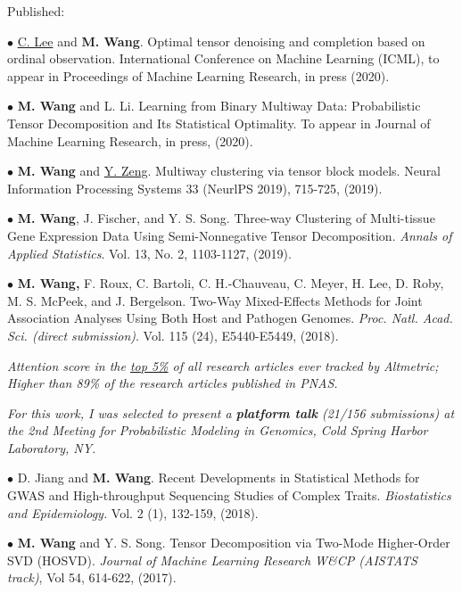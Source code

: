 \documentclass[letterpaper]{article}
\renewenvironment{itemize}{
  \begin{list}{}{
    \setlength{\leftmargin}{1.5em}
  }
}{
  \end{list}
}
\begin{document}
Published:
\begin{itemize}
\item$\bullet$ \underline{C. Lee} and {\bf M. Wang}. Optimal tensor denoising and completion based on ordinal observation. International Conference on Machine Learning (ICML), to appear in Proceedings of Machine Learning Research, in press (2020). 

\item$\bullet$ {\bf M. Wang} and L. Li. Learning from Binary Multiway Data: Probabilistic Tensor Decomposition and Its Statistical Optimality. To appear in Journal of Machine Learning Research, in press, (2020).

\item$\bullet$  {\bf M. Wang} and \underline{Y. Zeng}. Multiway clustering via tensor block models. Neural Information Processing Systems 33 (NeurlPS 2019), 715-725, (2019).

\item$\bullet$ {\bf M. Wang}, J. Fischer, and Y. S. Song. Three-way Clustering of Multi-tissue Gene Expression Data Using Semi-Nonnegative Tensor Decomposition. {\it Annals of Applied Statistics}. Vol. 13, No. 2, 1103-1127, (2019). 

\item$\bullet$ {\bf M. Wang,} F. Roux, C. Bartoli, C. H.-Chauveau, C. Meyer, H. Lee, D. Roby,  M. S. McPeek, and J. Bergelson. Two-Way Mixed-Effects Methods for Joint Association Analyses Using Both Host and Pathogen Genomes. {\it Proc. Natl. Acad. Sci. (direct submission)}. Vol. 115 (24), E5440-E5449, (2018).

{\it Attention score in the \underline{top 5\%} of all research articles ever tracked by Altmetric; Higher than 89\% of the research articles published in PNAS.}

{\it For this work, I was selected to present a \emph{\bf platform talk} (21/156 submissions) at the 2nd Meeting for Probabilistic Modeling in Genomics, Cold Spring Harbor Laboratory, NY.}

\item$\bullet$ D. Jiang and {\bf M. Wang}. Recent Developments in Statistical Methods for GWAS and High-throughput Sequencing Studies of Complex Traits. {\it Biostatistics and Epidemiology.} Vol. 2 (1), 132-159, (2018).

\item$\bullet$  {\bf M. Wang} and Y. S. Song. Tensor Decomposition via Two-Mode Higher-Order SVD (HOSVD). {\it Journal of Machine Learning Research W\&CP (AISTATS track)}, Vol 54, 614-622, (2017).


\end{itemize}
\end{document}
